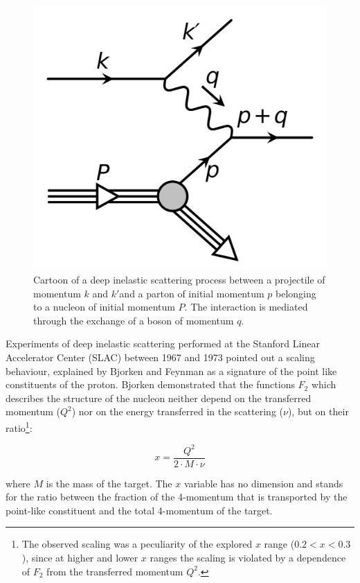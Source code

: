 \begin{figure}[!ht]
\begin{center}
\includegraphics[width=0.5\linewidth]{Chapters/Introduction/Figs/DIS.pdf}
\caption{Cartoon of a deep inelastic scattering process between a projectile of momentum $k$ and $k'$and a parton of initial momentum $p$ belonging to a nucleon of initial momentum $P$. The interaction is mediated through the exchange of a boson of momentum $q$. 
}
\label{fig:DIS}
\end{center}
\end{figure}

Experiments of deep inelastic scattering performed at the Stanford Linear Accelerator Center (SLAC) between 1967 and 1973 pointed out a scaling behaviour, explained by Bjorken and Feynman as a signature of the point like constituents of the proton.
Bjorken demonstrated that the functions $F_2$ which describes the structure of the nucleon neither depend on the transferred momentum ($Q^2$) nor on the energy transferred in the scattering ($\nu$), but on their ratio\footnote{The observed scaling was a peculiarity of the explored $x$ range ($0.2<x<0.3$), since at higher and lower $x$ ranges the scaling is violated by a dependence of $F_2$ from the transferred momentum $Q^2$.}:

\begin{equation}
    x = \frac{Q^2}{2\cdot M \cdot \nu}
\end{equation}

where $M$ is the mass of the target.
The $x$ variable has no dimension and stands for the ratio between the fraction of the 4-momentum that is transported by the point-like constituent and the total 4-momentum of the target.

